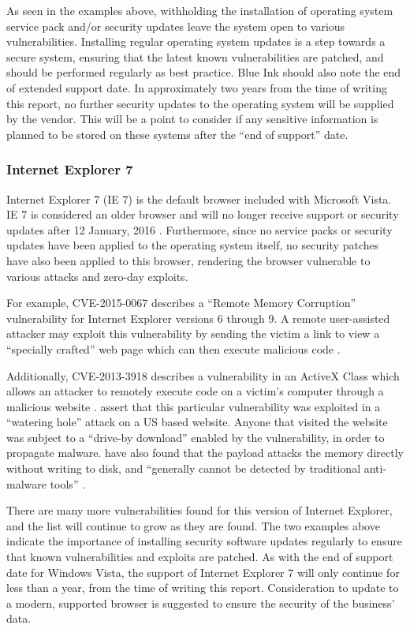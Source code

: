 As seen in the examples above, withholding the installation of operating system service pack and/or security updates leave the system open to various vulnerabilities. Installing regular operating system updates is a step towards a secure system, ensuring that the latest known vulnerabilities are patched, and should be performed regularly as best practice. Blue Ink should also note the end of extended support date. In approximately two years from the time of writing this report, no further security updates to the operating system will be supplied by the vendor. This will be a point to consider if any sensitive information is planned to be stored on these systems after the ``end of support'' date.

\subsubsection{Internet Explorer 7}

Internet Explorer 7 (IE 7) is the default browser included with Microsoft Vista. IE 7 is considered an older browser and will no longer receive support or security updates after 12 January, 2016 \citep{Capriotti2014}. Furthermore, since no service packs or security updates have been applied to the operating system itself, no security patches have also been applied to this browser, rendering the browser vulnerable to various attacks and zero-day exploits.

For example, CVE-2015-0067 describes a ``Remote Memory Corruption'' vulnerability for Internet Explorer versions 6 through 9. A remote user-assisted attacker may exploit this vulnerability by sending the victim a link to view a ``specially crafted'' web page which can then execute malicious code \citep{SecurityFocus2015}.

Additionally, CVE-2013-3918 describes a vulnerability in an ActiveX Class which allows an attacker to remotely execute code on a victim's computer through a malicious website \citep{Ozkan2013, Microsoft2013}. \citet{Chen2013} assert that this particular vulnerability was exploited in a ``watering hole'' attack on a US based website. Anyone that visited the website was subject to a ``drive-by download'' enabled by the vulnerability, in order to propagate malware. \citet{Moran2013} have also found that the payload attacks the memory directly without writing to disk, and ``generally cannot be detected by traditional anti-malware tools'' \citep{Wilson2013}.

There are many more vulnerabilities found for this version of Internet Explorer, and the list will continue to grow as they are found. The two examples above indicate the importance of installing security software updates regularly to ensure that known vulnerabilities and exploits are patched. As with the end of support date for Windows Vista, the support of Internet Explorer 7 will only continue for less than a year, from the time of writing this report. Consideration to update to a modern, supported browser is suggested to ensure the security of the business' data.


